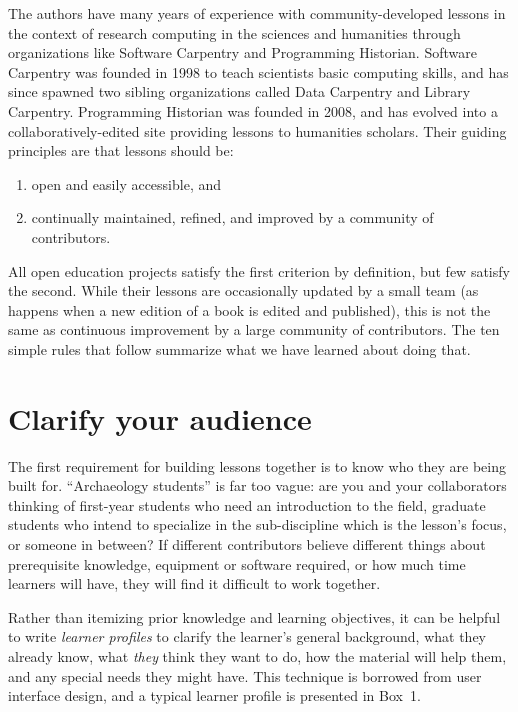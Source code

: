 \documentclass[10pt,letterpaper]{article}
\newcommand{\rulemajor}[2]{\section{#1}\label{#2}}
\begin{document}
The authors have many years of experience with community-developed lessons
in the context of research computing in the sciences and humanities
through organizations like Software Carpentry and Programming Historian.
Software Carpentry was founded in 1998 to teach scientists basic computing skills,
and has since spawned two sibling organizations called Data Carpentry and Library Carpentry.
Programming Historian was founded in 2008,
and has evolved into a collaboratively-edited site providing lessons to humanities scholars.
Their guiding principles are that lessons should be:

\begin{enumerate}

\item
  open and easily accessible, and

\item
  continually maintained, refined, and improved
  by a community of contributors.

\end{enumerate}

All open education projects satisfy the first criterion by definition,
but few satisfy the second.
While their lessons are occasionally updated by a small team
(as happens when a new edition of a book is edited and published),
this is not the same as continuous improvement by a large community of contributors.
The ten simple rules that follow summarize what we have learned about doing that.

\rulemajor{Clarify your audience}{audience}

The first requirement for building lessons together is
to know who they are being built for.
``Archaeology students'' is far too vague:
are you and your collaborators thinking of
first-year students who need an introduction to the field,
graduate students who intend to specialize in the sub-discipline which is the lesson's focus,
or someone in between?
If different contributors believe different things about prerequisite knowledge,
equipment or software required,
or how much time learners will have,
they will find it difficult to work together.

Rather than itemizing prior knowledge and learning objectives,
it can be helpful to write \emph{learner profiles} to clarify
the learner's general background,
what they already know,
what \emph{they} think they want to do,
how the material will help them,
and any special needs they might have.
This technique is borrowed from user interface design,
and a typical learner profile is presented in Box~1.
\end{document}
